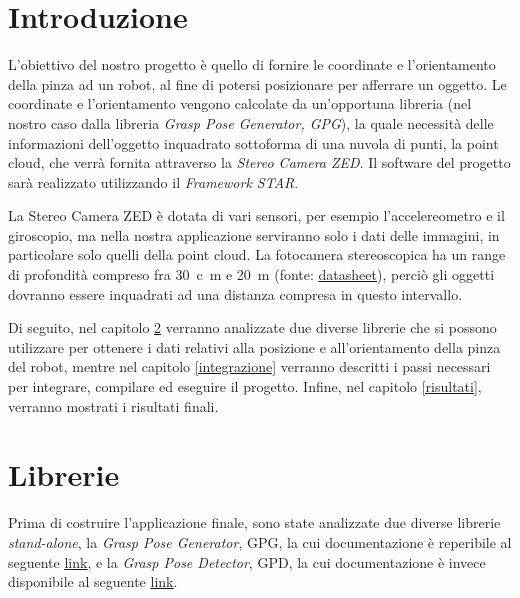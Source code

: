 \documentclass{report}
\begin{document}
\chapter{Introduzione}
L'obiettivo del nostro progetto è quello di fornire le coordinate e l'orientamento della pinza ad un robot, al fine di potersi posizionare per afferrare un oggetto. Le coordinate e l'orientamento vengono calcolate da un'opportuna libreria (nel nostro caso dalla libreria \textit{Grasp Pose Generator, GPG}), la quale necessità delle informazioni dell'oggetto inquadrato sottoforma di una nuvola di punti, la point cloud, che verrà fornita attraverso la \textit{Stereo Camera ZED}. Il software del progetto sarà realizzato utilizzando il \textit{Framework STAR}. \par
La Stereo Camera ZED è dotata di vari sensori, per esempio l'accelereometro e il giroscopio, ma nella nostra applicazione serviranno solo i dati delle immagini, in particolare solo quelli della point cloud. La fotocamera stereoscopica ha un range di profondità compreso fra \SI{30}{c\meter} e \SI{20}{\meter} (fonte: \textcolor{blue}{\underline{\href{https://www.stereolabs.com/assets/datasheets/zed2-camera-datasheet.pdf}{datasheet}}}), perciò gli oggetti dovranno essere inquadrati ad una distanza compresa in questo intervallo. \par
Di seguito, nel capitolo \ref{librerie} verranno analizzate due diverse librerie che si possono utilizzare per ottenere i dati relativi alla posizione e all'orientamento della pinza del robot, mentre nel capitolo \ref{integrazione} verranno descritti i passi necessari per integrare, compilare ed eseguire il progetto. Infine, nel capitolo \ref{risultati}, verranno mostrati i risultati finali.
\newpage
\chapter{Librerie}\label{librerie}
Prima di costruire l'applicazione finale, sono state analizzate due diverse librerie \textit{stand-alone}, la \textit{Grasp Pose Generator}, GPG, la cui documentazione è reperibile al seguente \textcolor{blue}{\underline{\href{https://github.com/atenpas/gpg}{link}}}, e la \textit{Grasp Pose Detector}, GPD, la cui documentazione è invece disponibile al seguente \textcolor{blue}{\underline{\href{https://github.com/atenpas/gpd}{link}}}.\par
{}
\end{document}
